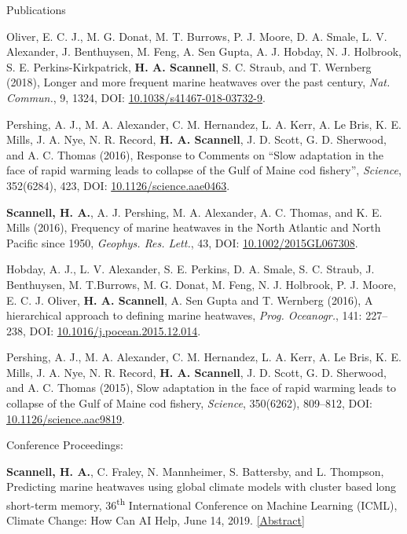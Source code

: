 \documentclass{resume} %
\begin{document}
\begin{rSection}{Publications}
\begin{etaremune}
\item 
{Oliver, E. C. J., M. G. Donat, M. T. Burrows, P. J. Moore, D. A. Smale, L. V. Alexander, J. Benthuysen, M. Feng, A. Sen Gupta, A. J. Hobday, N. J. Holbrook, S. E. Perkins-Kirkpatrick, {\bf H. A. Scannell}, S. C. Straub, and T. Wernberg (2018), Longer and more frequent marine heatwaves over the past century, \textit{Nat. Commun.}, 9, 1324, DOI: \href{https://doi.org/10.1038/s41467-018-03732-9}{10.1038/s41467-018-03732-9}.}

\item 
{Pershing, A. J., M. A. Alexander, C. M. Hernandez, L. A. Kerr, A. Le Bris, K. E. Mills, J. A. Nye, N. R. Record, {\bf H. A. Scannell}, J. D. Scott, G. D. Sherwood, and A. C. Thomas (2016), Response to Comments on “Slow adaptation in the face of rapid warming leads to collapse of the Gulf of Maine cod fishery”, \textit{Science}, 352(6284), 423, DOI: \href{https://doi.org/10.1126/science.aae0463}{10.1126/science.aae0463}.}

\item 
{{\bf Scannell, H. A.}, A. J. Pershing, M. A. Alexander, A. C. Thomas, and K. E. Mills (2016), Frequency of 
marine heatwaves in the North Atlantic and North Pacific since 1950, \textit{Geophys. Res. Lett.}, 43, DOI: \href{https://doi.org/10.1002/2015GL067308}{10.1002/2015GL067308}.}

\item 
{Hobday, A. J., L. V. Alexander, S. E. Perkins, D. A. Smale, S. C. Straub, J. Benthuysen, M. T.Burrows, M. G. Donat, M. Feng, N. J. Holbrook, P. J. Moore, E. C. J. Oliver, {\bf H. A. Scannell}, A. Sen Gupta and T. Wernberg (2016), A hierarchical approach to defining marine heatwaves, \textit{Prog. Oceanogr.}, 141: 227–238, DOI: \href{https://doi.org/10.1016/j.pocean.2015.12.014}{10.1016/j.pocean.2015.12.014}.}
    
\item 
{Pershing, A. J., M. A. Alexander, C. M. Hernandez, L. A. Kerr, A. Le Bris, K. E. Mills, J. A. Nye, N. R. Record, {\bf H. A. Scannell}, J. D. Scott, G. D. Sherwood, and A. C. Thomas (2015), Slow adaptation in the face of rapid warming leads to collapse of the Gulf of Maine cod fishery, \textit{Science}, 350(6262), 809–812, DOI: \href{https://doi.org/10.1126/science.aac9819}{10.1126/science.aac9819}.}

\end{etaremune}
\newpage

Conference Proceedings:
\begin{etaremune}
\item 
{{\bf Scannell, H. A.}, C. Fraley, N. Mannheimer, S. Battersby, and L. Thompson, Predicting marine heatwaves using global climate models with cluster based long short-term memory, 36\textsuperscript{th} International Conference on Machine Learning (ICML), Climate Change: How Can AI Help, June 14, 2019. \href{https://www.climatechange.ai/papers/icml2019/38}{[Abstract]}}
\end{etaremune}


\end{rSection}
\end{document}

